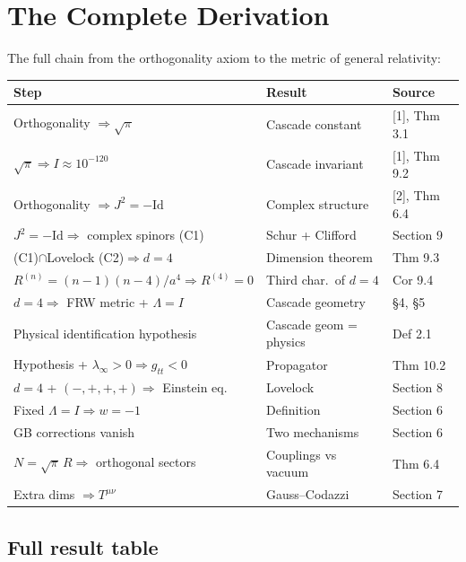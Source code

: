 \documentclass[12pt,a4paper]{article}
\begin{document}
\section{The Complete Derivation}\label{sec:the-complete-derivation}

The full chain from the orthogonality axiom to the metric of general relativity:

\begin{center}
\small
\begin{tabular}{lll}
\hline
Step & Result & Source \\
\hline
Orthogonality $\Rightarrow \sqrt{\pi}$ & Cascade constant & [1], Thm 3.1 \\
$\sqrt{\pi} \Rightarrow I \approx 10^{-120}$ & Cascade invariant & [1], Thm 9.2 \\
Orthogonality $\Rightarrow J^2 = -\text{Id}$ & Complex structure & [2], Thm 6.4 \\
$J^2 = -\text{Id} \Rightarrow$ complex spinors (C1) & Schur + Clifford & Section 9 \\
(C1)$\cap$Lovelock (C2)$\Rightarrow d = 4$ & Dimension theorem & Thm 9.3 \\
$R^{(n)} = (n-1)(n-4)/a^4 \Rightarrow R^{(4)} = 0$ & Third char.\ of $d = 4$ & Cor 9.4 \\
$d = 4 \Rightarrow$ FRW metric + $\Lambda = I$ & Cascade geometry & \S4, \S5 \\
Physical identification hypothesis & Cascade geom = physics & Def 2.1 \\
Hypothesis + $\lambda_\infty > 0 \Rightarrow g_{tt} < 0$ & Propagator & Thm 10.2 \\
$d = 4$ + $(-,+,+,+) \Rightarrow$ Einstein eq. & Lovelock & Section 8 \\
Fixed $\Lambda = I \Rightarrow w = -1$ & Definition & Section 6 \\
GB corrections vanish & Two mechanisms & Section 6 \\
$N = \sqrt{\pi}\,R \Rightarrow$ orthogonal sectors & Couplings vs vacuum & Thm 6.4 \\
Extra dims $\Rightarrow T^{\mu\nu}$ & Gauss--Codazzi & Section 7 \\
\hline
\end{tabular}
\end{center}

\subsection{Full result table}
\end{document}

